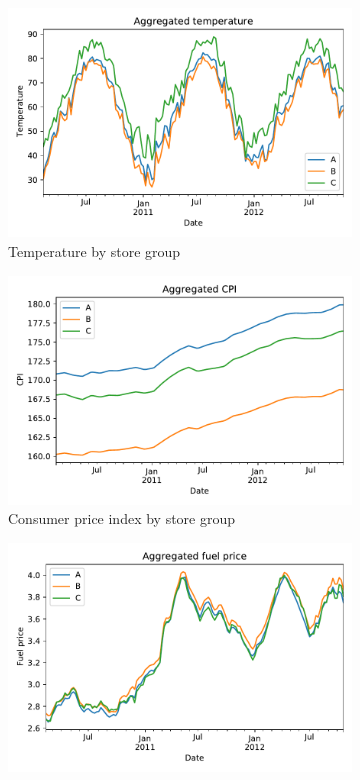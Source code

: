 \documentclass[english, 12pt, a4paper, sci, utf8, a-1b, online]{aaltothesis}
\begin{document}
\begin{figure}[htb]
	\begin{subfigure}[b]{0.5\textwidth}
		\centering
		\includegraphics[width=\textwidth]{../plots/dataset/dataset_plot_temperature.pdf}
		\caption{Temperature by store group}
		\label{fig:data_temp}
	\end{subfigure}
	\hfill
	\begin{subfigure}[b]{0.5\textwidth}
		\centering
		\includegraphics[width=\textwidth]{../plots/dataset/dataset_plot_CPI.pdf}
		\caption{Consumer price index by store group}
		\label{fig:data_cpi}
	\end{subfigure}
	\begin{subfigure}[b]{0.5\textwidth}
		\centering
		\includegraphics[width=\textwidth]{../plots/dataset/dataset_plot_fuel_price.pdf}

\end{subfigure}
\end{figure}
\end{document}
